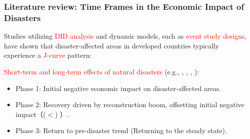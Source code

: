 \documentclass[serif, aspectratio=169]{beamer}
\begin{document}
\begin{frame}[label=literature_review1]
\frametitle{Literature review: Time Frames in the Economic Impact of Disasters}








\vspace{-0.25cm}

Studies utilizing \textcolor{red}{DID analysis} and dynamic models, such as \textcolor{red}{event study designs}, have shown that disaster-affected areas in developed countries typically experience a \textcolor{red}{J-curve} pattern:


    \begin{minipage}[c]{0.4\linewidth}
        \small

        \vspace{-3.1cm}
        
\textcolor{red}{Short-term and long-term effects of natural disasters} (e.g., \citet{Deryugina2018TheReturns}, \citet{Canessa2021WomensShocks}, \citet{Kahraman2023AEarthquake}, \citet{Porcelli2019TheItaly}): 
\begin{itemize}
    \item Phase 1: Initial negative economic impact on disaster-affected areas.
    \item Phase 2: Recovery driven by reconstruction boom, offsetting initial negative impact（($<$) ）.
    \item Phase 3: Return to pre-disaster trend (Returning to the steady state).
\end{itemize}


\end{minipage}
\end{frame}
\end{document}
